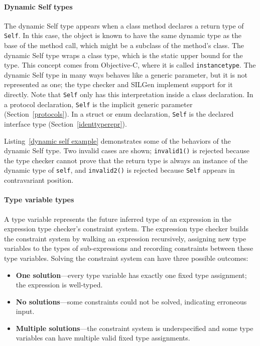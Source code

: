 \documentclass[../generics]{subfiles}
\begin{document}
\paragraph{Dynamic Self types}
The dynamic Self type appears when a class method declares a return type of \texttt{Self}. In this case, the object is known to have the same dynamic type as the base of the method call, which might be a subclass of the method's class. The dynamic Self type wraps a class type, which is the static upper bound for the type. This concept comes from Objective-C, where it is called \texttt{instancetype}. The dynamic Self type in many ways behaves like a generic parameter, but it is not represented as one; the type checker and SILGen implement support for it directly. Note that \texttt{Self} only has this interpretation inside a class declaration. In a protocol declaration, \texttt{Self} is the implicit generic parameter (Section~\ref{protocols}). In a struct or enum declaration, \texttt{Self} is the declared interface type (Section~\ref{identtyperepr}).

Listing~\ref{dynamic self example} demonstrates some of the behaviors of the dynamic Self type. Two invalid cases are shown; \texttt{invalid1()} is rejected because the type checker cannot prove that the return type is always an instance of the dynamic type of \texttt{self}, and \texttt{invalid2()} is rejected because \texttt{Self} appears in contravariant position.

\paragraph{Type variable types}
A type variable represents the future inferred type of an expression in the expression type checker's constraint system. The expression type checker builds the constraint system by walking an expression recursively, assigning new type variables to the types of sub-expressions and recording constraints between these type variables. Solving the constraint system can have three possible outcomes:
\begin{itemize}
\item \textbf{One solution}---every type variable has exactly one fixed type assignment; the expression is well-typed.
\item \textbf{No solutions}---some constraints could not be solved, indicating erroneous input.
\item \textbf{Multiple solutions}---the constraint system is underspecified and some type variables can have multiple valid fixed type assignments.
\end{itemize}
\end{document}
